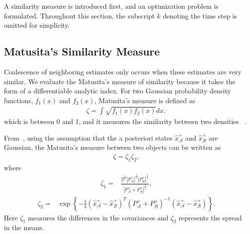 \documentclass[10pt]{article}
\theoremstyle{plain}\theorembodyfont{\normalfont}
\begin{document}
A similarity measure is introduced first, and an optimization problem is formulated. Throughout this section, the subscript $k$ denoting the time step is omitted for simplicity. 


	
\subsection{Matusita's Similarity Measure}

Coalescence of neighboring estimates only occurs when these estimates are very similar. We evaluate the Matusita's measure of similarity because it takes the form of a differentiable analytic index. For two Gaussian probability density functions, $f_1(x)$ and $f_2(x)$, Matusita's measure is defined as
\begin{align*}
\zeta = \int \sqrt{f_1(x)f_2(x)}dx,
\end{align*}
which is between 0 and 1, and it measures the similarity between two densities ~\cite{Coal_k}. 

From~\cite{Coal_k}, using the assumption that the a posteriori states $\hat x_\mathcal{A}^+$ and $\hat x_\mathcal{B}^+$ are Gaussian, the Matusita's measure between two objects can be written as
\begin{align}
\zeta=\zeta_1\zeta_2,
\end{align}
where
\begin{align}
\label{Q}
\zeta_1=&\frac{2^\frac{n}{2}|P_\mathcal{A}^+|^{\frac{1}{4}}|P_\mathcal{B}^+|^{\frac{1}{4}}}{|P_\mathcal{A}^++P_\mathcal{B}^+|^{\frac{1}{2}}},
\end{align}
\begin{align}
\label{R}
\zeta_2=&\exp{\left\{-\frac{1}{4}(\hat x^+_\mathcal{A}-\hat x^+_\mathcal{B})^T(P_\mathcal{A}^++P_\mathcal{B}^+)^{-1}(\hat x^+_\mathcal{A}-\hat x^+_\mathcal{B})\right\}}.
\end{align}
Here $\zeta_1$ measures the differences in the covariances and $\zeta_2$ represents the spread in the means.

	
\end{document}
